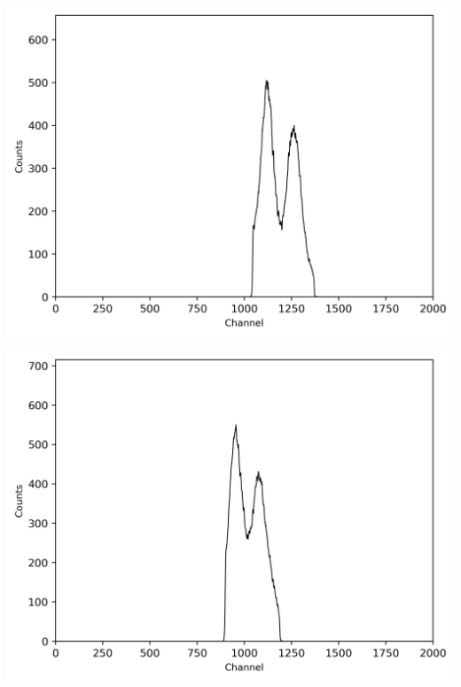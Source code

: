 \begin{center}
    \begin{adjustbox}{max width=\linewidth, keepaspectratio}
        \includegraphics[]{png/60CoEnergiewindow1}
    \end{adjustbox}
    \label{fig:}
\end{center}
%
\begin{center}
    \begin{adjustbox}{max width=\linewidth, keepaspectratio}
        \includegraphics[]{png/60CoEnergiewindow2}
    \end{adjustbox}
    \label{fig:}
\end{center}
%
